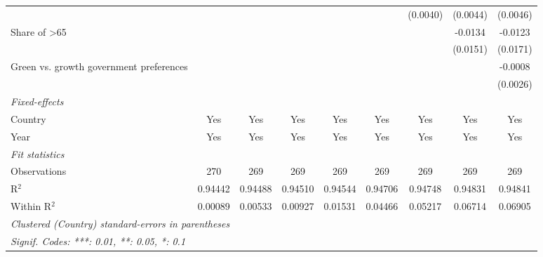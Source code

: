 \begin{table}[htbp]
\begin{tabular}{lcccccccc}
                                                              &          &          &          &          &          & (0.0040) & (0.0044) & (0.0046)\\   
      Share of >65                                            &          &          &          &          &          &          & -0.0134  & -0.0123\\   
                                                              &          &          &          &          &          &          & (0.0151) & (0.0171)\\   
      Green vs. growth government preferences                 &          &          &          &          &          &          &          & -0.0008\\   
                                                              &          &          &          &          &          &          &          & (0.0026)\\   
      \midrule
      \emph{Fixed-effects}\\
      Country                                                 & Yes      & Yes      & Yes      & Yes      & Yes      & Yes      & Yes      & Yes\\  
      Year                                                    & Yes      & Yes      & Yes      & Yes      & Yes      & Yes      & Yes      & Yes\\  
      \midrule
      \emph{Fit statistics}\\
      Observations                                            & 270      & 269      & 269      & 269      & 269      & 269      & 269      & 269\\  
      R$^2$                                                   & 0.94442  & 0.94488  & 0.94510  & 0.94544  & 0.94706  & 0.94748  & 0.94831  & 0.94841\\  
      Within R$^2$                                            & 0.00089  & 0.00533  & 0.00927  & 0.01531  & 0.04466  & 0.05217  & 0.06714  & 0.06905\\  
      \midrule \midrule
      \multicolumn{9}{l}{\emph{Clustered (Country) standard-errors in parentheses}}\\
      \multicolumn{9}{l}{\emph{Signif. Codes: ***: 0.01, **: 0.05, *: 0.1}}\\
   \end{tabular}
\end{table}


